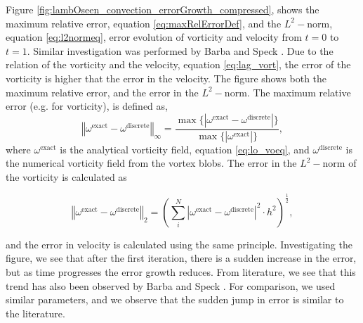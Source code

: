 Figure \ref{fig:lambOseen_convection_errorGrowth_compressed}, shows the maximum relative error, equation \ref{eq:maxRelErrorDef}, and the $L^2-\mathrm{norm}$, equation \ref{eq:l2normeq}, error evolution of vorticity and velocity from $t=0$ to $t=1$. Similar investigation was performed by Barba \cite{Barba2004c} and Speck \cite{Speck2011a}. Due to the relation of the vorticity and the velocity, equation \ref{eq:lag_vort}, the error of the vorticity is higher that the error in the velocity. The figure shows both the maximum relative error, and the error in the $L^2-\mathrm{norm}$. The maximum relative error (e.g. for vorticity), is defined as,
	\begin{equation}
	\left\Vert \omega^{\mathrm{exact}} - \omega^{\mathrm{discrete}} \right\Vert_{\infty} = \frac{\max\{\left|\omega^{\mathrm{exact}} - \omega^{\mathrm{discrete}}\right|\}}{\max\{\left|\omega^{\mathrm{exact}}\right|\}},
	\label{eq:maxRelErrorDef}
	\end{equation}
where $\omega^{\mathrm{exact}}$ is the analytical vorticity field, equation	\ref{eq:lo_voeq}, and $\omega^{\mathrm{discrete}}$ is the numerical vorticity field from the vortex blobs. The error in the $L^2-\mathrm{norm}$ of the vorticity is calculated as 

	\begin{equation}
	\left\Vert \omega^{\mathrm{exact}} - \omega^{\mathrm{discrete}} \right\Vert_2 = \left(\sum_{i}^{N}\left| \omega^{\mathrm{exact}} - \omega^{\mathrm{discrete}} \right|^2 \cdot h^2\right)^{\frac{1}{2}},
	\label{eq:l2normeq}
	\end{equation}

and the error in velocity is calculated using the same principle. Investigating the figure, we see that after the first iteration, there is a sudden increase in the error, but as time progresses the error growth reduces. From literature, we see that this trend has also been observed by Barba \cite{Barba2004c} and Speck \cite{Speck2011a}. For comparison, we used similar parameters, and we observe that the sudden jump in error is similar to the literature.

